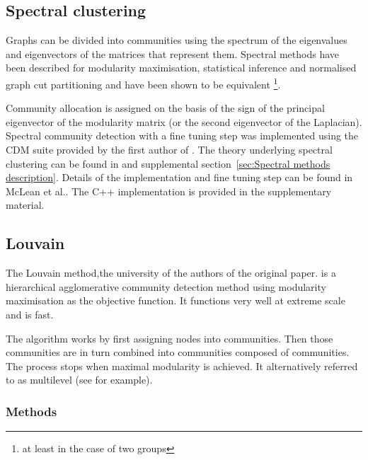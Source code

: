 




\subsection{Spectral clustering}
Graphs can be divided into communities using the spectrum of the eigenvalues and eigenvectors of the matrices that represent them\cite{newman2006finding}. Spectral methods have been described for modularity maximisation, statistical inference and normalised graph cut partitioning and have been shown to be equivalent \footnote{at least in the case of two groups}\cite{newman2013spectral}.

Community allocation is assigned on the basis of the sign of the principal eigenvector of the modularity matrix (or the second eigenvector of the Laplacian). Spectral community detection with a fine tuning step was implemented using the CDM suite provided by the first author of \cite{mclean2016improved}. The theory underlying spectral clustering can be found in \cite{newman2013spectral} and supplemental section~\ref{sec:Spectral methods description}. Details of the implementation and fine tuning step can be found in McLean et al.\cite{mclean2016improved}. The C++ implementation is provided in the supplementary material. 


\subsection{Louvain}
\label{sec:Louvain}
The Louvain method,the university of the authors of the original paper. is a hierarchical agglomerative community detection method using modularity maximisation as the objective function. It functions very well at extreme scale and is fast\cite{blondel2008fast}.

The algorithm works by first assigning nodes into communities. Then those communities are in turn combined into communities composed of communities. The process stops when maximal modularity is achieved. It alternatively referred to as multilevel (see for example\cite{yang2016comparative}).
\subsubsection{Methods}

